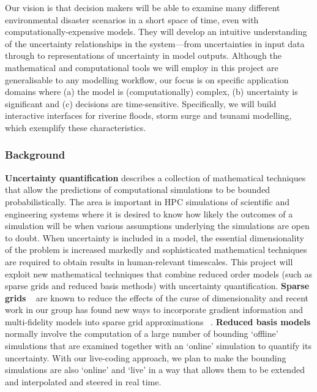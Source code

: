 Our vision is that decision makers will be able
to examine many different environmental disaster scenarios in a short
space of time, even with computationally-expensive models. They will 
develop an intuitive understanding of the uncertainty
relationships in the system---from uncertainties in input data through
to representations of uncertainty in model outputs. 
Although the mathematical and computational tools we will employ in
this project are generalisable to any modelling workflow, our focus is
on specific application domains where (a) the model is
(computationally) complex, (b) uncertainty is significant and (c)
decisions are time-sensitive. Specifically, we will build interactive
interfaces for riverine floods, storm surge and tsunami modelling,
which exemplify these characteristics.
\fi


\subsubsection*{Background}

{\bf Uncertainty quantification} describes a collection of
mathematical techniques that allow the predictions of computational
simulations to be bounded probabilistically. The area is important in
HPC simulations of scientific and
engineering systems where it is desired to know how likely the
outcomes of a simulation will be when various assumptions underlying
the simulations are open to doubt. When uncertainty is included in a
model, the essential dimensionality of the problem is increased
markedly and sophisticated mathematical techniques are required
to obtain results in human-relevant timescales.
This project will exploit new mathematical techniques that
combine {reduced order models} (such as {sparse grids and reduced
basis methods}) with uncertainty quantification. {\bf Sparse grids}
~\parencite{BungartzGriebel2004} are known to reduce the effects of
the curse of dimensionality and recent work in our group has found new
ways to incorporate gradient information and multi-fidelity models
into sparse grid approximations
~\parencite{deBaarHarding2015,Jakeman2015,deBaarRDM2015}.  {\bf Reduced
basis models} normally involve the computation of a large number of bounding
`offline' simulations that are examined together with an `online'
simulation to quantify its uncertainty. With our live-coding approach,
we plan to make the bounding simulations are
also  `online' and `live' in a way that allows them to be extended and
interpolated and steered in real time.

